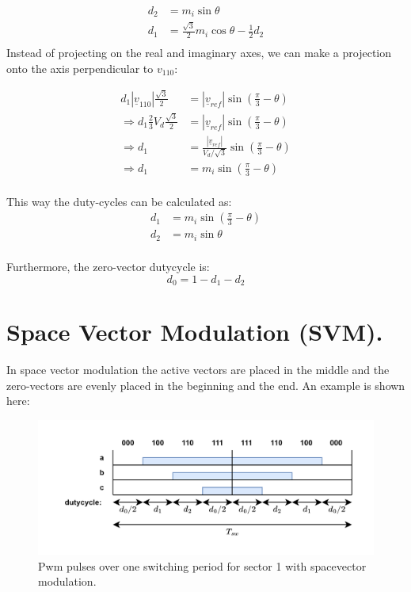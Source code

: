 \documentclass[]{book}
\begin{document}
\[
\begin{aligned}
d_2  &  =  m_i \sin\theta \\
d_1  &  =  \frac{\sqrt{3}}{2} m_i   \cos\theta  - \frac{1}{2}d_2\\
\end{aligned}
\]
Instead of projecting on the real and imaginary axes, we can make a projection onto the axis perpendicular to \(v_{110}\):

\[
\begin{aligned}
d_1|\underline{v}_{110}| \frac{\sqrt{3}}{2}  &  =  |\underline{v}_{ref}|\sin(\frac{\pi}{3}-\theta)  \\
\Rightarrow d_1 \frac{2}{3} V_d  \frac{\sqrt{3}}{2}  &  =  |\underline{v}_{ref}|\sin(\frac{\pi}{3}-\theta)\\
\Rightarrow d_1   &  =  \frac{|\underline{v}_{ref}|}{V_d/\sqrt{3}}  \sin(\frac{\pi}{3}-\theta)\\
\Rightarrow d_1   &  =  m_i  \sin(\frac{\pi}{3}-\theta)\\
\end{aligned}
\]

This way the duty-cycles can be calculated as:
\[
\begin{aligned}
d_1   &  =  m_i  \sin(\frac{\pi}{3}-\theta)\\
d_2  &  =  m_i \sin\theta \\
\end{aligned}
\]

Furthermore, the zero-vector dutycycle is:
\[
d_0 = 1 - d_1 - d_2
\]

\hypertarget{space-vector-modulation-svm.}{%
\section{Space Vector Modulation (SVM).}\label{space-vector-modulation-svm.}}

In space vector modulation the active vectors are placed in the middle and the zero-vectors are evenly placed in the beginning and the end. An example is shown here:

\begin{figure}
\includegraphics[width=1\linewidth]{images/modulation/switchperiod} \caption{Pwm pulses over one switching period for sector 1 with spacevector modulation.}\label{fig:unnamed-chunk-3}
\end{figure}
\end{document}

